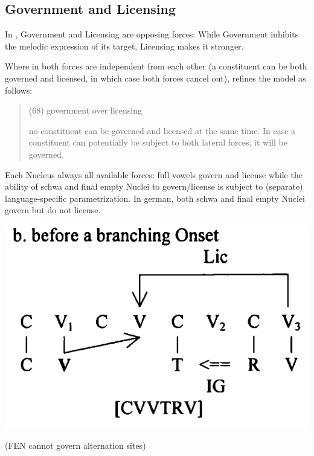 \subsection{Government and Licensing}

In \CVCV, Government and Licensing are opposing forces:
While Government inhibits the melodic expression of
its target, Licensing makes it stronger.

Where in \cite{scheer2004} both forces are independent
from each other (a constituent can be both governed
and licensed, in which case both forces cancel out),
\cite{scheer2012} refines the model as follows:
\blockquote[\cite{scheer2012}]{
  (68) government over licensing
  
  no constituent can be governed and licensed at the
  same time. In case a constituent can potentially be
  subject to both lateral forces, it will be governed.
}

Each Nucleus always 
all available forces: full vowels govern and license
while the ability of schwa and final empty Nuclei to
govern/license is subject to (separate) language-specific
parametrization.
In german, both schwa and final empty Nuclei govern but
do not license.

\par
{}

\includegraphics[width=.5\textwidth]{figures/lic-over-branching-onset.png}


{\color{gray} (FEN cannot govern alternation sites)}